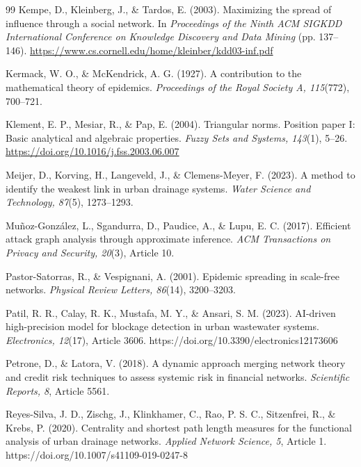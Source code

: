 \begin{thebibliography}{99}
Kempe, D., Kleinberg, J., \& Tardos, E. (2003). Maximizing the spread of influence through a social network. In \textit{Proceedings of the Ninth ACM SIGKDD International Conference on Knowledge Discovery and Data Mining} (pp. 137--146). \url{https://www.cs.cornell.edu/home/kleinber/kdd03-inf.pdf}

Kermack, W. O., \& McKendrick, A. G. (1927). A contribution to the mathematical theory of epidemics. \textit{Proceedings of the Royal Society A, 115}(772), 700--721.

Klement, E. P., Mesiar, R., \& Pap, E. (2004). Triangular norms. Position paper I: Basic analytical and algebraic properties. \textit{Fuzzy Sets and Systems, 143}(1), 5--26. \url{https://doi.org/10.1016/j.fss.2003.06.007}

Meijer, D., Korving, H., Langeveld, J., \& Clemens-Meyer, F. (2023). A method to identify the weakest link in urban drainage systems. \textit{Water Science and Technology, 87}(5), 1273--1293.

Mu\~noz-Gonz\'alez, L., Sgandurra, D., Paudice, A., \& Lupu, E. C. (2017). Efficient attack graph analysis through approximate inference. \textit{ACM Transactions on Privacy and Security, 20}(3), Article 10.

Pastor-Satorras, R., \& Vespignani, A. (2001). Epidemic spreading in scale-free networks. \textit{Physical Review Letters, 86}(14), 3200--3203.

Patil, R. R., Calay, R. K., Mustafa, M. Y., \& Ansari, S. M. (2023). AI-driven high-precision model for blockage detection in urban wastewater systems. \textit{Electronics, 12}(17), Article 3606. https://doi.org/10.3390/electronics12173606

Petrone, D., \& Latora, V. (2018). A dynamic approach merging network theory and credit risk techniques to assess systemic risk in financial networks. \textit{Scientific Reports, 8}, Article 5561.

Reyes-Silva, J. D., Zischg, J., Klinkhamer, C., Rao, P. S. C., Sitzenfrei, R., \& Krebs, P. (2020). Centrality and shortest path length measures for the functional analysis of urban drainage networks. \textit{Applied Network Science, 5}, Article 1. https://doi.org/10.1007/s41109-019-0247-8


\end{thebibliography}
